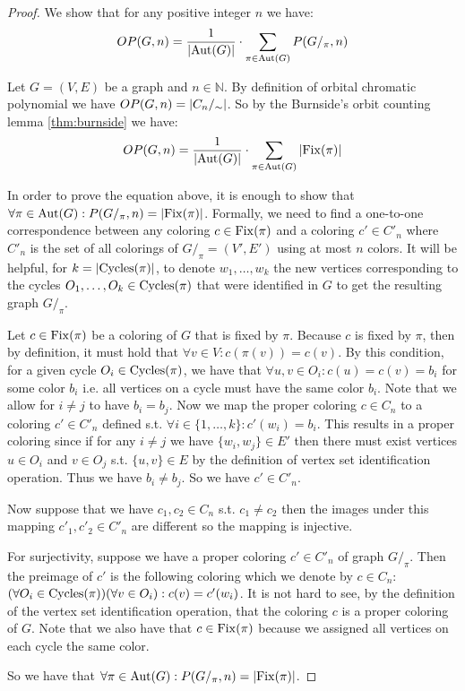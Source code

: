 \begin{proof}
    We show that for any positive integer $n$ we have: $$OP(G,n) = \frac{1}{\left|{\operatorname{Aut}(G)}\right|} \cdot \sum_{\pi \in \operatorname{Aut}(G)}P(G/_\pi,n)$$

    Let $G=(V,E)$ be a graph and $n \in \mathbb{N}$. By definition of orbital chromatic polynomial we have $OP(G,n) = \left|{C_n /_{\sim}}\right|$. So by the Burnside's orbit counting lemma \ref{thm:burnside} we have:
    $$OP(G,n) = \frac{1}{\left|{\operatorname{Aut}(G)}\right|} \cdot \sum_{\pi \in \operatorname{Aut}(G)} \left|{\operatorname{Fix}(\pi)}\right|$$

    In order to prove the equation above, it is enough to show that $\forall \pi \in \operatorname{Aut}(G) : P(G/_{\pi},n) = \left|{\operatorname{Fix}(\pi)}\right|$. Formally, we need to find a one-to-one correspondence between any coloring $c \in \operatorname{Fix}(\pi)$ and a coloring $c' \in C'_n$ where $C'_n$ is the set of all colorings of $G /_\pi = (V',E')$ using at most $n$ colors. It will be helpful, for $k = \left|{\operatorname{Cycles}(\pi)}\right|$, to denote $w_1, \ldots , w_k$ the new vertices corresponding to the cycles $O_1, \ldots ,O_k \in \operatorname{Cycles}(\pi)$ that were identified in $G$ to get the resulting graph $G/_\pi$.
    
    Let $c \in \operatorname{Fix}(\pi)$ be a coloring of $G$ that is fixed by $\pi$. Because $c$ is fixed by $\pi$, then by definition, it must hold that $\forall v \in V : c(\pi(v)) = c(v)$. By this condition, for a given cycle $O_i \in \operatorname{Cycles}(\pi)$, we have that $\forall u,v \in O_i : c(u) = c(v) = b_i$ for some color $b_i$ i.e. all vertices on a cycle must have the same color $b_i$. Note that we allow for $i \neq j$ to have $b_i = b_j$. Now we map the proper coloring $c \in C_n$ to a coloring $c' \in C'_n$ defined s.t. $\forall i \in \{1, \ldots ,k\} : c'(w_i) = b_i$. This results in a proper coloring since if for any $i \neq j$ we have $\{w_i,w_j\} \in E'$ then there must exist vertices $u \in O_i$ and $v \in O_j$ s.t. $\{u,v\} \in E$ by the definition of vertex set identification operation. Thus we have $b_i \neq b_j$. So we have $c' \in C'_n$. 
    
    Now suppose that we have $c_1,c_2 \in C_n$ s.t. $c_1 \neq c_2$ then the images under this mapping $c'_1,c'_2 \in C'_n$ are different so the mapping is injective.

    For surjectivity, suppose we have a proper coloring $c' \in C'_n$ of graph $G/_\pi$. Then the preimage of $c'$ is the following coloring which we denote by $c \in C_n$: $(\forall O_i \in \operatorname{Cycles}(\pi))( \forall v \in O_i) : c(v) = c'(w_i)$. It is not hard to see, by the definition of the vertex set identification operation, that the coloring $c$ is a proper coloring of $G$. Note that we also have that $c \in \operatorname{Fix}(\pi)$ because we assigned all vertices on each cycle the same color.

    So we have that $\forall \pi \in \operatorname{Aut}(G) : P(G/_{\pi},n) = \left|{\operatorname{Fix}(\pi)}\right|$. 

    \vspace{5pt}
     
\end{proof}

